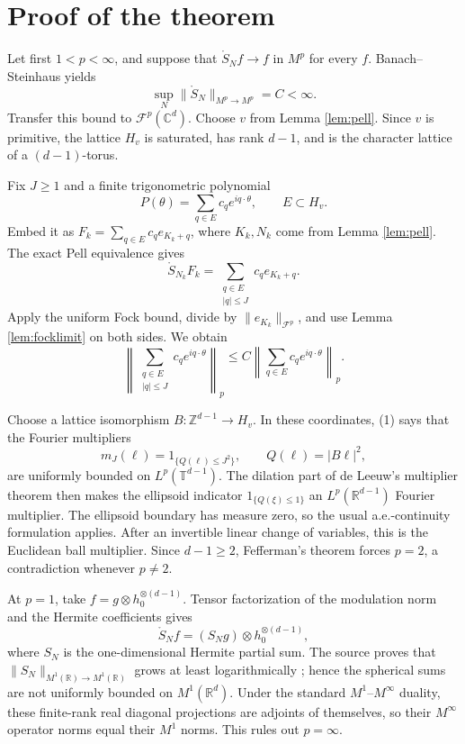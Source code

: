 \documentclass[11pt]{article}
\newcommand{\R}{\mathbb R}
\newcommand{\C}{\mathbb C}
\newcommand{\T}{\mathbb T}
\newcommand{\F}{\mathcal F}
\newcommand{\SN}{\mathring S}
\begin{document}
\section*{Proof of the theorem}

Let first $1<p<\infty$, and suppose that $\SN_Nf\to f$ in $M^p$ for
every $f$.  Banach--Steinhaus yields
\[
 \sup_N\|\SN_N\|_{M^p\to M^p}=C<\infty.
\]
Transfer this bound to $\F^p(\C^d)$.  Choose $v$ from Lemma
\ref{lem:pell}.  Since $v$ is primitive, the lattice $H_v$ is saturated,
has rank $d-1$, and is the character lattice of a $(d-1)$-torus.

Fix $J\ge1$ and a finite trigonometric polynomial
\[
 P(\theta)=\sum_{q\in E}c_qe^{iq\cdot\theta},\qquad E\subset H_v.
\]
Embed it as $F_k=\sum_{q\in E}c_qe_{K_k+q}$, where $K_k,N_k$ come from
Lemma \ref{lem:pell}.  The exact Pell equivalence gives
\[
 \SN_{N_k}F_k=\sum_{\substack{q\in E\\|q|\le J}}c_qe_{K_k+q}.
\]
Apply the uniform Fock bound, divide by $\|e_{K_k}\|_{\F^p}$, and use Lemma
\ref{lem:focklimit} on both sides.  We obtain
\[
 \left\|\sum_{\substack{q\in E\\|q|\le J}}c_qe^{iq\cdot\theta}\right\|_p
 \le C\left\|\sum_{q\in E}c_qe^{iq\cdot\theta}\right\|_p. \tag{1}
\]

Choose a lattice isomorphism $B:\mathbb Z^{d-1}\to H_v$.  In these
coordinates, (1) says that the Fourier multipliers
\[
 m_J(\ell)=1_{\{Q(\ell)\le J^2\}},\qquad
 Q(\ell)=|B\ell|^2,
\]
are uniformly bounded on $L^p(\T^{d-1})$.  The dilation part of de Leeuw's
multiplier theorem \cite{deLeeuw} then makes the ellipsoid indicator
$1_{\{Q(\xi)\le1\}}$ an $L^p(\R^{d-1})$ Fourier multiplier.  The ellipsoid
boundary has measure zero, so the usual a.e.-continuity formulation applies.
After an invertible linear change of variables, this is the Euclidean ball
multiplier.  Since $d-1\ge2$, Fefferman's theorem \cite{Fefferman} forces
$p=2$, a contradiction whenever $p\ne2$.

At $p=1$, take $f=g\otimes h_0^{\otimes(d-1)}$.  Tensor factorization of
the modulation norm and the Hermite coefficients gives
\[
 \SN_N f=(S_Ng)\otimes h_0^{\otimes(d-1)},
\]
where $S_N$ is the one-dimensional Hermite partial sum.  The source proves
that $\|S_N\|_{M^1(\R)\to M^1(\R)}$ grows at least logarithmically
\cite[Theorem 1.1]{JS}; hence the spherical sums are not uniformly bounded on
$M^1(\R^d)$.  Under the standard $M^1$--$M^\infty$ duality, these
finite-rank real diagonal projections are adjoints of themselves, so their
$M^\infty$ operator norms equal their $M^1$ norms.  This rules out
$p=\infty$.
\end{document}
